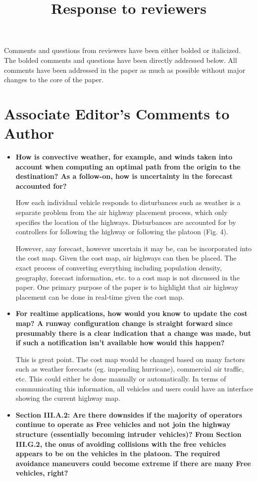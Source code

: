 \documentclass[submit]{aiaa-pretty}
\title{Response to reviewers}
\begin{document}
\maketitle

Comments and questions from reviewers have been either bolded or italicized. The bolded comments and questions have been directly addressed below. All comments have been addressed in the paper as much as possible without major changes to the core of the paper.

\section{Associate Editor's Comments to Author}
\begin{itemize}
\item\textbf{How is convective weather, for example, and winds taken into account when computing an optimal path from the origin to the destination?  As a follow-on, how is uncertainty in the forecast accounted for?}

How each individual vehicle responds to disturbances such as weather is a separate problem from the air highway placement process, which only specifies the location of the highways. Disturbances are accounted for by controllers for following the highway or following the platoon (Fig. 4). 

However, any forecast, however uncertain it may be, can be incorporated into the cost map. Given the cost map, air highways can then be placed. The exact process of converting everything including population density, geography, forecast information, etc. to a cost map is not discussed in the paper. One primary purpose of the paper is to highlight that air highway placement can be done in real-time given the cost map.

\item\textbf{For realtime applications, how would you know to update the cost map?  A runway configuration change is straight forward since presumably there is a clear indication that a change was made, but if such a notification isn’t available how would this happen?}

This is great point. The cost map would be changed based on many factors such as weather forecasts (eg. impending hurricane), commercial air traffic, etc. This could either be done manually or automatically. In terms of communicating this information, all vehicles and users could have an interface showing the current highway map. 

\item\textbf{Section III.A.2: Are there downsides if the majority of operators continue to operate as Free vehicles and not join the highway structure (essentially becoming intruder vehicles)?  From Section III.G.2, the onus of avoiding collisions with the free vehicles appears to be on the vehicles in the platoon.  The required avoidance maneuvers could become extreme if there are many Free vehicles, right?}


\end{itemize}
\end{document}
